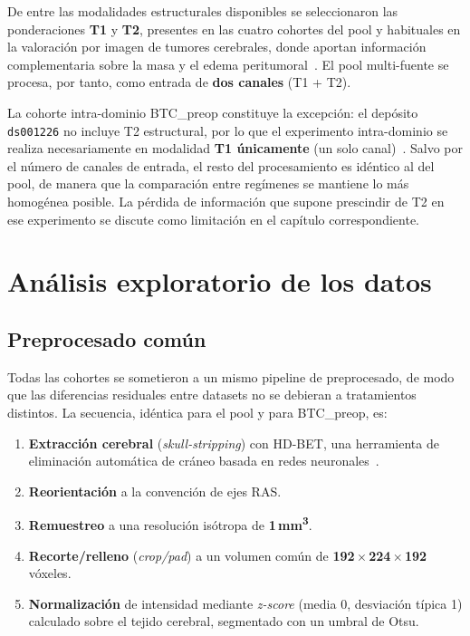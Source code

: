 De entre las modalidades estructurales disponibles se seleccionaron las
ponderaciones \textbf{T1} y \textbf{T2}, presentes en las cuatro cohortes del
pool y habituales en la valoración por imagen de tumores cerebrales, donde
aportan información complementaria sobre la masa y el edema
peritumoral~\cite{villanuevameyer2017imaging,martucci2023mri}. El pool
multi-fuente se procesa, por tanto, como entrada de \textbf{dos canales}
(T1 + T2).

La cohorte intra-dominio BTC\_preop constituye la excepción: el depósito
\texttt{ds001226} no incluye T2 estructural, por lo que el experimento
intra-dominio se realiza necesariamente en modalidad \textbf{T1 únicamente}
(un solo canal)~\cite{aerts2022btcpreop}. Salvo por el número de canales de
entrada, el resto del procesamiento es idéntico al del pool, de manera que la
comparación entre regímenes se mantiene lo más homogénea posible. La pérdida de
información que supone prescindir de T2 en ese experimento se discute como
limitación en el capítulo correspondiente.

\section{Análisis exploratorio de los datos}

\subsection{Preprocesado común}

Todas las cohortes se sometieron a un mismo pipeline de preprocesado, de modo
que las diferencias residuales entre datasets no se debieran a tratamientos
distintos. La secuencia, idéntica para el pool y para BTC\_preop, es:

\begin{enumerate}
  \item \textbf{Extracción cerebral} (\emph{skull-stripping}) con HD-BET, una
  herramienta de eliminación automática de cráneo basada en redes
  neuronales~\cite{isensee2019hdbet}.
  \item \textbf{Reorientación} a la convención de ejes RAS.
  \item \textbf{Remuestreo} a una resolución isótropa de \textbf{1\,mm\textsuperscript{3}}.
  \item \textbf{Recorte/relleno} (\emph{crop/pad}) a un volumen común de
  \textbf{192\,$\times$\,224\,$\times$\,192} vóxeles.
  \item \textbf{Normalización} de intensidad mediante \emph{z-score} (media 0,
  desviación típica 1) calculado sobre el tejido cerebral, segmentado con un
  umbral de Otsu.
\end{enumerate}

